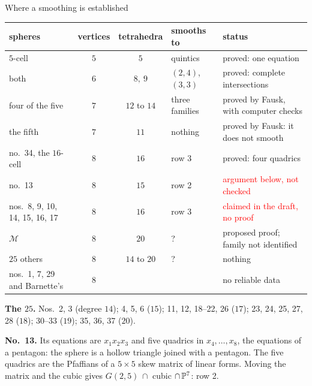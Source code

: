 \begin{frame}{Where a smoothing is established}
{\centering\footnotesize
\renewcommand{\arraystretch}{0.97}\setlength{\tabcolsep}{4pt}
\begin{tabular}{lccll}
spheres & vertices & tetrahedra & smooths to & status\\ \hline
\(5\)-cell & \(5\) & \(5\) & quintics & proved: one equation\\
both & \(6\) & \(8,\ 9\) & \((2,4)\), \((3,3)\) & proved: complete intersections\\
four of the five & \(7\) & \(12\) to \(14\) & three families & proved by Fausk, with computer checks\\
the fifth & \(7\) & \(11\) & nothing & proved by Fausk: it does not smooth\\ \hline
no.\ 34, the \(16\)-cell & \(8\) & \(16\) & row 3 & proved: four quadrics\\
no.\ 13 & \(8\) & \(15\) & row 2 & \textcolor{red}{argument below, not checked}\\
nos.\ 8, 9, 10, 14, 15, 16, 17 & \(8\) & \(16\) & row 3 & \textcolor{red}{claimed in the draft, no proof}\\
\(\mathcal M\) & \(8\) & \(20\) & ? & proposed proof; family not identified\\
\(25\) others & \(8\) & \(14\) to \(20\) & ? & nothing\\
nos.\ 1, 7, 29 and Barnette's & \(8\) & & & no reliable data
\end{tabular}\par}\smallskip
{\footnotesize\textbf{The \(25\).} Nos.\ 2, 3 (degree \(14\)); 4, 5, 6 (\(15\)); 11, 12, 18--22, 26 (\(17\)); 23, 24, 25, 27, 28 (\(18\)); 30--33 (\(19\)); 35, 36, 37 (\(20\)).
\par\smallskip
\textbf{No.\ 13.} Its equations are \(x_1x_2x_3\) and five quadrics in \(x_4,\dots,x_8\), the equations of a pentagon: the sphere is a hollow triangle joined with a pentagon. The five quadrics are the Pfaffians of a \(5\times5\) skew matrix of linear forms. Moving the matrix and the cubic gives \(G(2,5)\,\cap\) cubic \(\cap\,\mathbb P^7\): row 2.\par}
\end{frame}

